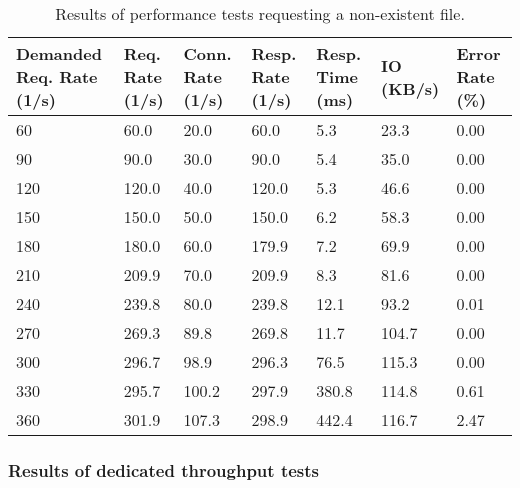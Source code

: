 \begin{table}[H]
  \centering
    \begin{tabular}{|m{2.5cm}|m{2cm}|m{2cm}|m{2cm}|m{2cm}|m{2cm}|m{2cm}|}
    \hline
    \textbf{Demanded Req. Rate} (1/s) & \textbf{Req. Rate} (1/s) & \textbf{Conn. Rate} (1/s) & \textbf{Resp. Rate} (1/s) & \textbf{Resp. Time} (ms) & \textbf{IO} (KB/s) & \textbf{Error Rate} (\%) \\
    \hline
    60 & 60.0 & 20.0 & 60.0 & 5.3 & 23.3 & 0.00 \\
    90 & 90.0 & 30.0 & 90.0 & 5.4 & 35.0 & 0.00 \\
    120 & 120.0 & 40.0 & 120.0 & 5.3 & 46.6 & 0.00 \\
    150 & 150.0 & 50.0 & 150.0 & 6.2 & 58.3 & 0.00 \\
    180 & 180.0 & 60.0 & 179.9 & 7.2 & 69.9 & 0.00 \\
    210 & 209.9 & 70.0 & 209.9 & 8.3 & 81.6 & 0.00 \\
    240 & 239.8 & 80.0 & 239.8 & 12.1 & 93.2 & 0.01 \\
    270 & 269.3 & 89.8 & 269.8 & 11.7 & 104.7 & 0.00 \\
    300 & 296.7 & 98.9 & 296.3 & 76.5 & 115.3 & 0.00 \\
    330 & 295.7 & 100.2 & 297.9 & 380.8 & 114.8 & 0.61 \\
    360 & 301.9 & 107.3 & 298.9 & 442.4 & 116.7 & 2.47 \\
    \hline
    \end{tabular}
  \caption{Results of performance tests requesting a non-existent file.}
  \label{tab:perf-res-404}
\end{table}
\hspace{2cm}

\subsubsection{Results of dedicated throughput tests}

